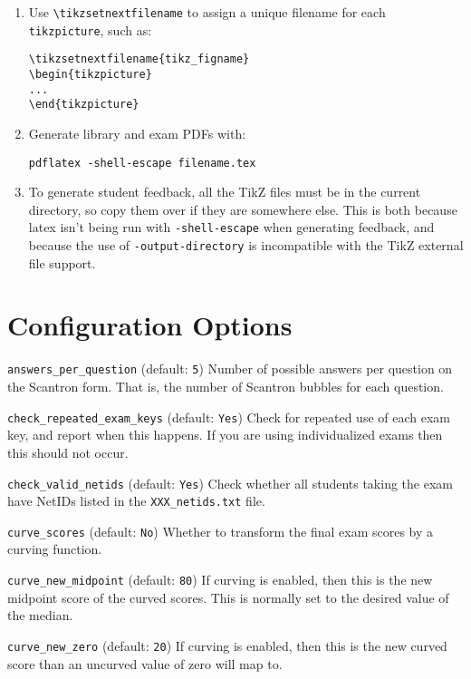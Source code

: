 \documentclass{article}
\begin{document}
\begin{enumerate}
\begin{enumerate}
  \item Use \verb+\tikzsetnextfilename+ to assign a unique filename for
    each \texttt{tikzpicture}, such as:
\begin{verbatim}
\tikzsetnextfilename{tikz_figname}
\begin{tikzpicture}
...
\end{tikzpicture}
\end{verbatim}
  \item Generate library and exam PDFs with:
\begin{verbatim}
pdflatex -shell-escape filename.tex
\end{verbatim}
  \item To generate student feedback, all the TikZ files must be in
    the current directory, so copy them over if they are somewhere
    else. This is both because latex isn't being run with
    \texttt{-shell-escape} when generating feedback, and because the
    use of \texttt{-output-directory} is incompatible with the TikZ
    external file support.
  \end{enumerate}
\end{enumerate}

\section{Configuration Options}

\hangindent=1cm \texttt{answers_per_question} (default: \texttt{5})
Number of possible answers per question on the Scantron form. That is,
the number of Scantron bubbles for each question.

\hangindent=1cm \texttt{check_repeated_exam_keys} (default:
\texttt{Yes}) Check for repeated use of each exam key, and report when
this happens. If you are using individualized exams then this should
not occur.

\hangindent=1cm \texttt{check_valid_netids} (default: \texttt{Yes})
Check whether all students taking the exam have NetIDs listed in the
\texttt{XXX_netids.txt} file.

\hangindent=1cm \texttt{curve_scores} (default: \texttt{No}) Whether
to transform the final exam scores by a curving function.

\hangindent=1cm \texttt{curve_new_midpoint} (default: \texttt{80}) If
curving is enabled, then this is the new midpoint score of the curved
scores. This is normally set to the desired value of the median.

\hangindent=1cm \texttt{curve_new_zero} (default: \texttt{20}) If
curving is enabled, then this is the new curved score than an uncurved
value of zero will map to.
\end{document}
